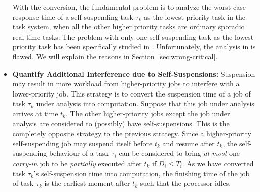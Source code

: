 \begin{itemize}
With the conversion, the fundamental problem is to analyze the worst-case response time of a self-suspending task $\tau_k$ as the lowest-priority task in the task system, when all the other higher priority tasks are ordinary sporadic real-time tasks. The problem with only one self-suspending task as the lowest-priority task has been specifically studied in \cite{LR:rtas10,ecrts15nelissen}. Unfortunately, the analysis in \cite{LR:rtas10} is flawed. We will explain the reasons in Section~\ref{sec:wrong-critical}.



\item {\bf Quantify Additional Interference due to Self-Suspensions:} Suspension may result in more workload from higher-priority jobs to interfere with a lower-priority job. This strategy is to convert the suspension time of a job of task $\tau_k$ under analysis into computation. Suppose that this job under analysis arrives at time $t_k$. The other higher-priority jobs except the job under analysis are considered to (possibly) have self-suspensions. This is the completely opposite strategy to the previous strategy. Since a higher-priority self-suspending job may suspend itself before $t_k$ and resume after $t_k$, the self-suspending behaviour of a task $\tau_i$ can be considered to bring \emph{at most} one \emph{carry-in} job to be \emph{partially} executed after $t_k$ if $D_i \leq T_i$. As we have converted task $\tau_k$'s self-suspension time into computation, the finishing time of the job of task $\tau_k$ is the earliest moment after $t_k$ such that the processor idles. 
\begin{itemize}

\end{itemize}
\end{itemize}

